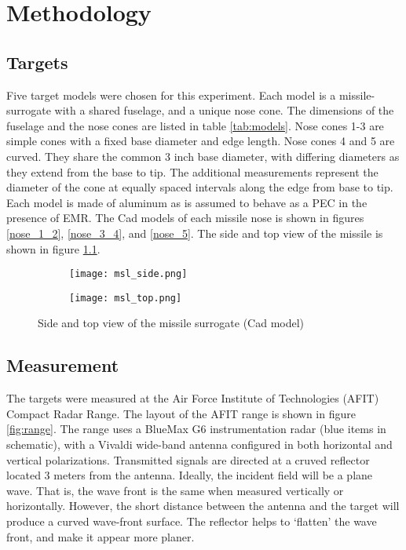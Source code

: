 \chapter{Methodology}
\label{ch:methodology}
\glsresetall

\section{Targets}

  Five target models were chosen for this experiment. Each model is a missile-surrogate with a shared fuselage, and a unique nose cone. The dimensions of the fuselage and the nose cones are listed in table \ref{tab:models}. Nose cones 1-3 are simple cones with a fixed base diameter and edge length. Nose cones 4 and 5 are curved. They share the common 3 inch base diameter, with  differing diameters as they extend from the base to tip. The additional measurements represent the diameter of the cone at equally spaced intervals along the edge from base to tip. Each model is made of aluminum as is assumed to behave as a PEC in the presence of EMR. The Cad models of each missile nose is shown in figures \ref{nose_1_2}, \ref{nose_3_4}, and \ref{nose_5}. The side and top view of the missile is shown in figure \ref{fig:missile_body}.

  \begin{figure}[htbp]
    \centering
    \begin{subfigure}{.5\textwidth}
      \centering
      \texttt{[image: msl\_side.png]}
    \end{subfigure}%
    \begin{subfigure}{.5\textwidth}
      \centering
      \texttt{[image: msl\_top.png]}
    \end{subfigure}
    \caption{Side and top view of the missile surrogate (Cad model)}
    \label{fig:missile_body}
  \end{figure}




\section{Measurement}
  The targets were measured at the Air Force Institute of Technologies (AFIT) Compact Radar Range. The layout of the AFIT range is shown in figure \ref{fig:range}. The range uses a BlueMax G6 instrumentation radar (blue items in schematic), with a Vivaldi wide-band antenna configured in both horizontal and vertical polarizations. Transmitted signals are directed at a cruved reflector located 3 meters from the antenna. Ideally, the incident field will be a plane wave. That is, the wave front is the same when measured vertically or horizontally. However, the short distance between the antenna and the target will produce a curved wave-front surface. The reflector helps to `flatten' the wave front, and make it appear more planer.

